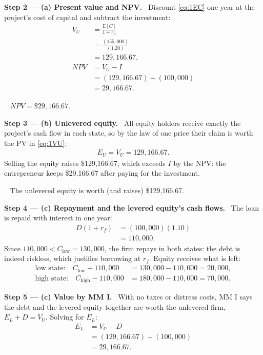 \documentclass[11pt,a4paper]{article}
\numberwithin{equation}{section}
\newcommand{\step}[2]{\par\smallskip\noindent\textbf{Step #1 --- #2.}~}
\newcommand{\answer}[1]{\par\smallskip\noindent\fbox{\textbf{Answer #1.}}~}
\newcommand{\E}{\mathbb{E}}
\begin{document}
\step{2}{(a) Present value and NPV} Discount \eqref{eq:1EC} one year at the project's cost of
capital and subtract the investment:
\begin{align}
  V_U &= \frac{\E[C]}{1+r_U} \label{eq:1VU}\\
      &= \frac{(155{,}000)}{(1.20)} \nonumber\\
      &= 129{,}166.67, \nonumber\\
  \mathit{NPV} &= V_U - I \label{eq:1NPV}\\
      &= (129{,}166.67)-(100{,}000) \nonumber\\
      &= 29{,}166.67. \nonumber
\end{align}
\answer{(a)} $\mathit{NPV}=\$29{,}166.67$.

\step{3}{(b) Unlevered equity} All-equity holders receive exactly the project's cash flow in
each state, so by the law of one price their claim is worth the PV in \eqref{eq:1VU}:
\begin{align}
  E_U = V_U = 129{,}166.67. \nonumber
\end{align}
Selling the equity raises \$129{,}166.67, which exceeds $I$ by the NPV: the entrepreneur keeps
\$29{,}166.67 after paying for the investment.
\answer{(b)} The unlevered equity is worth (and raises) \$129{,}166.67.

\step{4}{(c) Repayment and the levered equity's cash flows} The loan is repaid with interest
in one year:
\begin{align}
  D(1+r_f) &= (100{,}000)(1.10) \nonumber\\
           &= 110{,}000. \label{eq:1rep}
\end{align}
Since $110{,}000<C_{\text{low}}=130{,}000$, the firm repays in both states: the debt is indeed
riskless, which justifies borrowing at $r_f$. Equity receives what is left:
\begin{align}
  \text{low state:}\quad C_{\text{low}}-110{,}000 &= 130{,}000-110{,}000 = 20{,}000, \nonumber\\
  \text{high state:}\quad C_{\text{high}}-110{,}000 &= 180{,}000-110{,}000 = 70{,}000. \nonumber
\end{align}

\step{5}{(c) Value by MM I} With no taxes or distress costs, MM I says the debt and the levered
equity together are worth the unlevered firm, $E_L+D=V_U$. Solving for $E_L$:
\begin{align}
  E_L &= V_U - D \label{eq:1EL}\\
      &= (129{,}166.67)-(100{,}000) \nonumber\\
      &= 29{,}166.67. \nonumber
\end{align}
\end{document}
